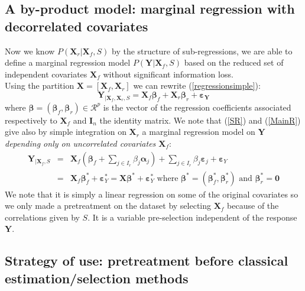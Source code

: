 \documentclass[11pt,a4paper]{article}
\begin{document}
\subsection{A by-product model: marginal regression with decorrelated covariates}
Now we know $P(\boldsymbol{X}_r|\boldsymbol{X}_f,S)$ by the structure of sub-regressions, we are able to define a marginal regression model $P(\boldsymbol{Y}|\boldsymbol{X}_f,S)$ based on the reduced set of independent covariates $\boldsymbol{X}_f$ without significant information loss. 
 	\\
Using the partition $\boldsymbol{X}=[\boldsymbol{X}_f,\boldsymbol{X}_r]$ we can rewrite (\ref{regressionsimple}):
	\begin{equation}
			\boldsymbol{Y}_{|\boldsymbol{X}_f,\boldsymbol{X}_r,S}=\boldsymbol{X}_f\boldsymbol{\beta}_f+\boldsymbol{X}_r\boldsymbol{\beta}_r+\boldsymbol{\varepsilon_Y} \label{MainR}
		\end{equation}
		where $\boldsymbol{\beta}=(\boldsymbol{\beta}_f,\boldsymbol{\beta}_r) \in  \mathcal{R}^p$ is the vector of the regression coefficients associated respectively to $\boldsymbol{X}_f$ and $\boldsymbol{I}_n$ the identity matrix. 
We note that (\ref{SR}) and (\ref{MainR}) give also by simple integration on $\boldsymbol{X}_r$ a marginal regression model on $\boldsymbol{Y}$ {\it depending only on uncorrelated covariates $\boldsymbol{X}_f$}:
\begin{eqnarray}
	\boldsymbol{Y}_{|\boldsymbol{X}_f,S}&=&\boldsymbol{X}_f (\boldsymbol{\beta}_f+ \sum_{j \in I_r}\beta_{j}\boldsymbol{\alpha}_j)+  \sum_{j \in I_r}\beta_{j}\boldsymbol{\varepsilon}_j+\boldsymbol{\varepsilon}_Y \label{Trueexpl} \\
	&=&\boldsymbol{X}_f\boldsymbol{\beta}_f^*+\boldsymbol{\varepsilon}_Y^*=\boldsymbol{X}\boldsymbol{\beta}^*+\boldsymbol{\varepsilon}_Y^* \textrm{ where }\boldsymbol{\beta}^*=(\boldsymbol{\beta}_f^*,\boldsymbol{\beta}_r^*) \textrm{ and } \boldsymbol{\beta}_r^*=\boldsymbol{0}\label{modexpl}
\end{eqnarray}
We note that it is simply a linear regression on some of the original covariates so we only made a pretreatment on the dataset by selecting $\boldsymbol{X}_f$ because of the correlations given by $S$.  It is a variable pre-selection independent of the response $\boldsymbol{Y}$. 
\subsection{Strategy of use: pretreatment before classical estimation/selection methods}\label{interpretation}
\end{document}
